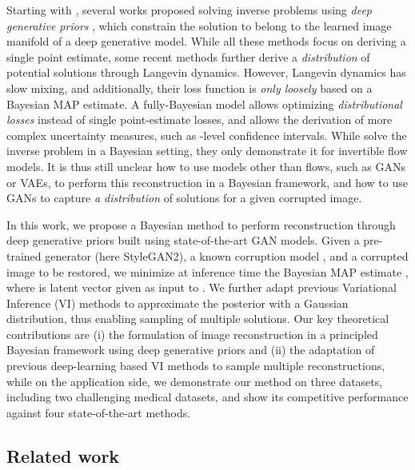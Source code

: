 \documentclass{article}
\begin{document}
Starting with \cite{bora2017compressed}, several works proposed solving inverse problems using \emph{deep generative priors} \cite{pan2020exploiting,asim2020invertible,hand2018phase,kelkar2021prior}, which constrain the solution to belong to the learned image manifold of a deep generative model. While all these methods focus on deriving a single point estimate, some recent methods further derive a \emph{distribution} of potential solutions \cite{jalal2021robust,jalal2021instance} through Langevin dynamics. However, Langevin dynamics has slow mixing, and additionally, their loss function is \emph{only loosely} based on a Bayesian MAP estimate. A fully-Bayesian model allows optimizing  \emph{distributional losses} instead of single point-estimate losses, and allows the derivation of more complex uncertainty measures, such as -level confidence intervals. While \cite{lugmayr2020srflow,whang2021composing} solve the inverse problem in a Bayesian setting, they only demonstrate it for invertible flow models. It is thus still unclear how to use models other than flows, such as GANs or VAEs, to perform this reconstruction in a Bayesian framework, and how to use GANs to capture \emph{a distribution} of solutions for a given corrupted image.

In this work, we propose a Bayesian method to perform reconstruction through deep generative priors built using state-of-the-art GAN models. Given a pre-trained generator  (here StyleGAN2), a known corruption model , and a corrupted image  to be restored, we minimize at inference time the Bayesian MAP estimate , where  is latent vector given as input to . We further adapt previous Variational Inference (VI) methods \cite{kingma2013auto,blundell2015weight} to approximate the posterior  with a Gaussian distribution, thus enabling sampling of multiple solutions. Our key theoretical contributions are (i) the formulation of image reconstruction in a principled Bayesian framework using deep generative priors and (ii) the adaptation of previous deep-learning based VI methods to sample multiple reconstructions, while on the application side, we demonstrate our method on three datasets, including two challenging medical datasets, and show its competitive performance against four state-of-the-art methods.





\subsection{Related work}
 
\end{document}
